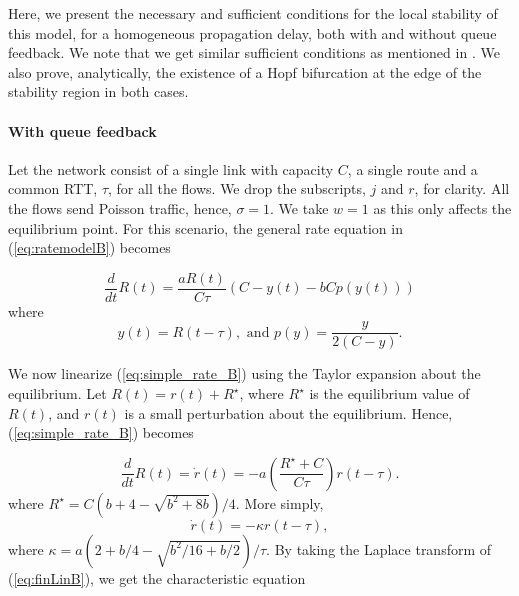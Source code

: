 \documentclass[conference]{IEEEtran}
\begin{document}
Here, we present the necessary and sufficient conditions for the local stability of this model, for 
a homogeneous propagation delay, both with and without queue feedback. We note 
that we get similar sufficient conditions as mentioned in \cite{krv}. We also prove, analytically, 
the existence of a Hopf bifurcation at the edge of the stability region in both cases.

\paragraph{With queue feedback}

Let the network 
consist of a single link with capacity $C$, a single route and a common RTT, $\tau$, for all the flows. We drop the subscripts, $j$ and $r$, for clarity. 
All the flows send Poisson traffic, hence, $\sigma = 1$. We take $w = 1$ as this 
only affects the equilibrium point. 
For this scenario, the general rate equation in (\ref{eq:ratemodelB}) becomes

\begin{equation}
\label{eq:simple_rate_B}
\frac{d}{dt}R\left(t\right) = \frac{aR\left(t\right)}{C\tau}\left(C - y\left(t\right) - bCp\left(y\left(t\right)\right)\right)
\end{equation}
where
\begin{equation}
\label{eq:simple_y_B}
y\left(t\right) = R\left(t-\tau\right),\text{ and } p\left(y\right) = \frac{y}{2\left(C - y\right)}.
\end{equation}

We now linearize (\ref{eq:simple_rate_B}) using the Taylor expansion about the 
equilibrium. Let $R\left(t\right) = r\left(t\right) + R^{\star}$, where $R^{\star}$ is 
the equilibrium value of $R\left(t\right)$, and $r\left(t\right)$ is a small perturbation about 
the equilibrium. Hence, (\ref{eq:simple_rate_B}) becomes

\begin{equation}
\label{eq:LinB}
\frac{d}{dt}R\left(t\right) = \dot{r}\left(t\right) = 
-a\left(\frac{R^{\star} + C}{C\tau}\right)r\left(t-\tau\right).
\end{equation}
where $R^{\star} = C\left(b+4-\sqrt{b^{2} + 8b}\right)/4$. More simply,
\begin{equation}
\label{eq:finLinB}
\dot{r}\left(t\right) = -\kappa r\left(t-\tau\right),
\end{equation}
where $\kappa = a\left(2 + b/4 - \sqrt{b^{2}/16 + b/2}\right)/\tau$. By taking the 
Laplace transform of (\ref{eq:finLinB}), we get the characteristic equation
\end{document}
